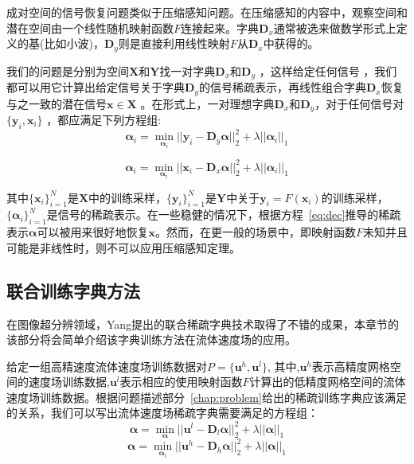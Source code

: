 成对空间的信号恢复问题类似于压缩感知问题。在压缩感知的内容中，观察空间和潜在空间由一个线性随机映射函数$F$连接起来。字典$\boldsymbol D_x$通常被选来做数学形式上定义的基(比如小波)，$\boldsymbol D_y$则是直接利用线性映射$F$从$\boldsymbol D_x$中获得的。

我们的问题是分别为空间$\boldsymbol X$和$\boldsymbol Y$找一对字典$\boldsymbol D_x$和$\boldsymbol D_y$ ，这样给定任何信号 ，我们都可以用它计算出给定信号关于字典$\boldsymbol D_y$的信号稀疏表示，再线性组合字典$\boldsymbol D_x$恢复与之一致的潜在信号$\boldsymbol x \in \boldsymbol X$ 。在形式上，一对理想字典$\boldsymbol D_x$和$\boldsymbol D_y$，对于任何信号对$\{\boldsymbol y_i, \boldsymbol x_i\}$ ，都应满足下列方程组:
\begin{equation}
\label{eq:decx}
\boldsymbol \alpha_i = \min_{\boldsymbol \alpha_i}||\boldsymbol y_i - \boldsymbol D_y \boldsymbol \alpha||_2^2 + \lambda||\boldsymbol \alpha_i||_1
\end{equation}

\begin{equation}
\label{eq:decy}
\boldsymbol \alpha_i = \min_{\boldsymbol \alpha_i}||\boldsymbol x_i - \boldsymbol D_x \boldsymbol \alpha||_2^2 + \lambda||\boldsymbol \alpha_i||_1
\end{equation}

其中$\{\boldsymbol x_i\}_{i = 1}^N$是$\boldsymbol X$中的训练采样，$\{\boldsymbol y_i\}_{i = 1}^N$是$\boldsymbol Y$中关于$\boldsymbol y_i = F(\boldsymbol x_i)$的训练采样，$\{\boldsymbol \alpha_i\}_{i = 1}^N$是信号的稀疏表示。在一些稳健的情况下，根据方程~\ref{eq:dec}推导的稀疏表示$\boldsymbol \alpha$可以被用来很好地恢复$\boldsymbol x$。然而，在更一般的场景中，即映射函数$F$未知并且可能是非线性时，则不可以应用压缩感知定理。

\subsection{联合训练字典方法}

在图像超分辨领域，Yang提出的联合稀疏字典技术取得了不错的成果，本章节的该部分将会简单介绍该字典训练方法在流体速度场的应用。

给定一组高精速度流体速度场训练数据对$P = \{\boldsymbol u^h,\boldsymbol u^l\}$, 其中,$\boldsymbol u^h$表示高精度网格空间的速度场训练数据,$\boldsymbol u^l$表示相应的使用映射函数$F$计算出的低精度网格空间的流体速度场训练数据。根据问题描述部分~\ref{chap:problem}给出的稀疏训练字典应该满足的关系，我们可以写出流体速度场稀疏字典需要满足的方程组：
\begin{equation}
\label{eq:dec}
\boldsymbol \alpha = \min_{\boldsymbol \alpha}||\boldsymbol u^l - \boldsymbol D_l \boldsymbol \alpha||_2^2 + \lambda||\boldsymbol \alpha||_1
\end{equation}
\begin{equation}
\boldsymbol \alpha = \min_{\boldsymbol \alpha_i}||\boldsymbol u^h - \boldsymbol D_h \boldsymbol \alpha||_2^2 + \lambda||\boldsymbol \alpha||_1
\end{equation}

